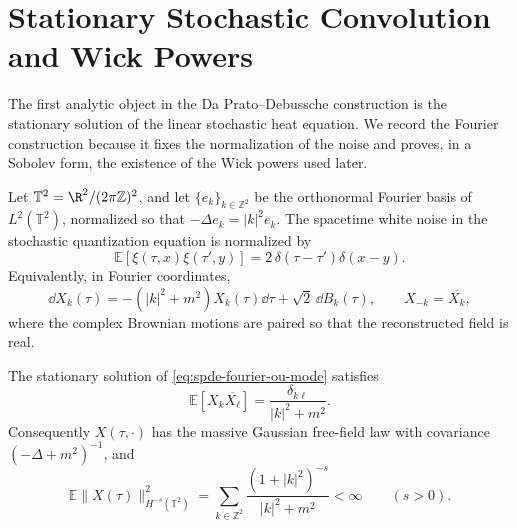 \section{Stationary Stochastic Convolution and Wick Powers}

The first analytic object in the Da Prato--Debussche construction is the
stationary solution of the linear stochastic heat equation.  We record the
Fourier construction because it fixes the normalization of the noise and
proves, in a Sobolev form, the existence of the Wick powers used later.

Let \(\mathbb T^2=\R^2/(2\pi\mathbb Z)^2\), and let
\(\{e_k\}_{k\in\mathbb Z^2}\) be the orthonormal Fourier basis of
\(L^2(\mathbb T^2)\), normalized so that
\(-\Delta e_k=|k|^2e_k\).  The spacetime white noise in the stochastic
quantization equation is normalized by
\[
  \mathbb E[\xi(\tau,x)\xi(\tau',y)]
  =
  2\,\delta(\tau-\tau')\delta(x-y).
\]
Equivalently, in Fourier coordinates,
\begin{equation}
  \dd X_k(\tau)
  =
  -(|k|^2+m^2)X_k(\tau)\dd\tau+\sqrt2\,\dd B_k(\tau),
  \qquad X_{-k}=\overline{X_k},
  \label{eq:spde-fourier-ou-mode}
\end{equation}
where the complex Brownian motions are paired so that the reconstructed
field is real.

\begin{lemma}
\label{lem:spde-stationary-ou-covariance}
The stationary solution of \eqref{eq:spde-fourier-ou-mode} satisfies
\begin{equation}
  \mathbb E[X_k\overline{X_\ell}]
  =
  \frac{\delta_{k\ell}}{|k|^2+m^2}.
  \label{eq:spde-stationary-fourier-covariance}
\end{equation}
Consequently \(X(\tau,\cdot)\) has the massive Gaussian free-field law with
covariance \((-\Delta+m^2)^{-1}\), and
\begin{equation}
  \mathbb E\|X(\tau)\|_{H^{-s}(\mathbb T^2)}^2
  =
  \sum_{k\in\mathbb Z^2}
  \frac{(1+|k|^2)^{-s}}{|k|^2+m^2}
  <\infty
  \qquad(s>0).
  \label{eq:spde-ou-negative-sobolev-bound}
\end{equation}
\end{lemma}

